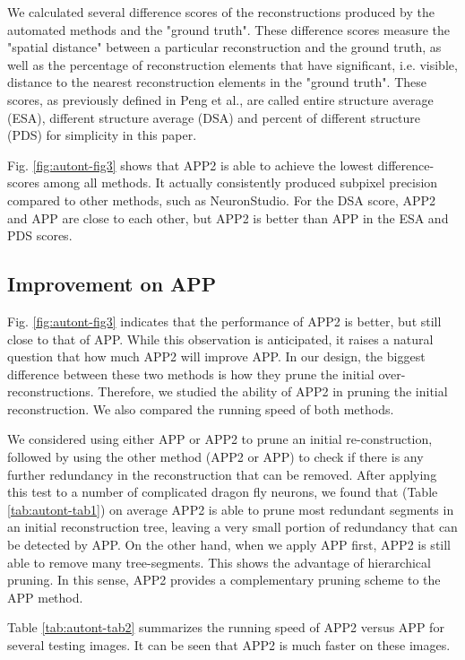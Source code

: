We calculated several difference scores of the reconstructions produced by the automated methods and the "ground truth". These difference scores measure the "spatial distance" between a particular reconstruction and the ground truth, as well as the percentage of reconstruction elements that have significant, i.e. visible, distance to the nearest reconstruction elements in the "ground truth". These scores, as previously defined in Peng et al.\cite{peng2010v3d}, are called entire structure average (ESA), different structure average (DSA) and percent of different structure (PDS) for simplicity in this paper. 

Fig. \ref{fig:autont-fig3} shows that APP2 is able to achieve the lowest difference-scores among all methods. It actually consistently produced subpixel precision compared to other methods, such as NeuronStudio. For the DSA score, APP2 and APP are close to each other, but APP2 is better than APP in the ESA and PDS scores. 

\subsection{Improvement on APP}
Fig. \ref{fig:autont-fig3} indicates that the performance of APP2 is better, but still close to that of APP. While this observation is anticipated, it raises a natural question that how much APP2 will improve APP. In our design, the biggest difference between these two methods is how they prune the initial over-reconstructions. Therefore, we studied the ability of APP2 in pruning the initial reconstruction. We also compared the running speed of both methods.

We considered using either APP or APP2 to prune an initial re-construction, followed by using the other method (APP2 or APP) to check if there is any further redundancy in the reconstruction that can be removed. After applying this test to a number of complicated dragon fly neurons, we found that (Table \ref{tab:autont-tab1}) on average APP2 is able to prune most redundant segments in an initial reconstruction tree, leaving a very small portion of redundancy that can be detected by APP. On the other hand, when we apply APP first, APP2 is still able to remove many tree-segments. This shows the advantage of hierarchical pruning. In this sense, APP2 provides a complementary pruning scheme to the APP method.  

Table \ref{tab:autont-tab2} summarizes the running speed of APP2 versus APP for several testing images. It can be seen that APP2 is much faster on these images.

